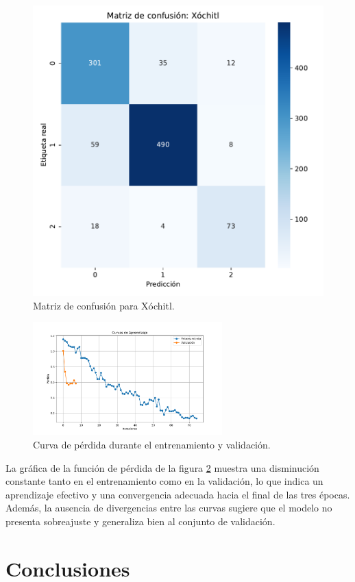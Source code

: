 \documentclass[10pt, a4paper]{article}
\begin{document}
	\begin{figure}[h!]
		\centering
		\begin{minipage}{0.4\textwidth} %
			\includegraphics[width=\linewidth]{conf_matrix_Xóchitl.pdf} 
			\caption{Matriz de confusión para Xóchitl.}
			\label{fig:cmXochitl}
		\end{minipage}
	\end{figure}

	\vspace{-3mm}
	\begin{figure}[H]
		\centering
		\includegraphics[width=0.65\textwidth]{curvas_de_perdida.pdf}
		\caption{Curva de pérdida durante el entrenamiento y validación.}
		\label{fig:curvaTrain}
	\end{figure}
	
	La gráfica de la función de pérdida de la figura \ref{fig:curvaTrain} muestra una disminución constante tanto en el entrenamiento como en la validación, lo que indica un aprendizaje efectivo y una convergencia adecuada hacia el final de las tres épocas. Además, la ausencia de divergencias entre las curvas sugiere que el modelo no presenta sobreajuste y generaliza bien al conjunto de validación.
	
	
	\section{Conclusiones}
	
	
	
	
	
	\printbibliography
	
	
	
\end{document}
